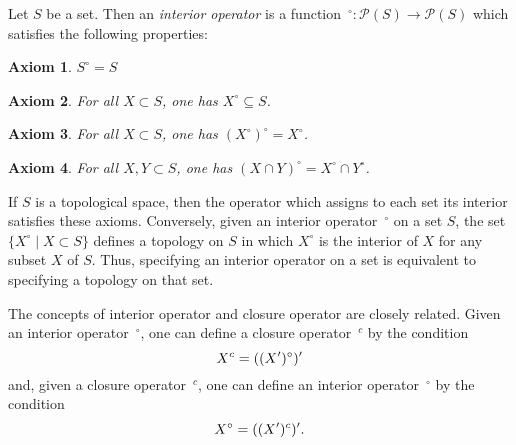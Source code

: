 \documentclass[12pt]{article}
\newtheorem{axiom}{Axiom}
\begin{document}
Let $S$ be a set.  Then an \emph{interior operator} is a function
$\,^\circ \colon \mathcal{P}(S) \to \mathcal{P}(S)$ which satisfies the 
following properties:
\begin{axiom}
$S^\circ = S$
\end{axiom}
\begin{axiom}
For all $X \subset S$, one has $X^\circ \subseteq S$.
\end{axiom}
\begin{axiom}
For all $X \subset S$, one has $(X^\circ)^\circ = X^\circ$.
\end{axiom}
\begin{axiom}
For all $X, Y \subset S$, one has $(X \cap Y)^\circ = 
X^\circ \cap Y^\circ$.
\end{axiom}

If $S$ is a topological space, then the operator which assigns to
each set its interior satisfies these axioms.  Conversely, given an
interior operator $\,^\circ$ on a set $S$, the set $\{X^\circ \mid
X \subset S\}$ defines a topology on $S$ in which $X^\circ$ is the
interior of $X$ for any subset $X$ of $S$.  Thus, specifying an
interior operator on a set is equivalent to specifying a topology
on that set.

The concepts of interior operator and closure operator are closely
related.  
Given an interior operator $\,^\circ$, one can 
define a closure operator $\,^c$ by the condition
 \[ X^c = ({(X')^\circ})\vphantom{X}' \]
and, given a closure operator $\,^c$, one can 
define an interior operator $\,^\circ$ by the condition
\ \[ X^\circ = ({(X')^c})\vphantom{X}' .\]
\end{document}
